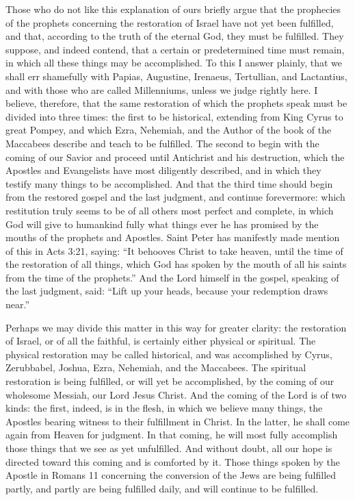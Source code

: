 Those who do not like this explanation of ours briefly argue that the prophecies of the prophets concerning the restoration of Israel have not yet been fulfilled, and that, according to the truth of the eternal God, they must be fulfilled. They suppose, and indeed contend, that a certain or predetermined time must remain, in which all these things may be accomplished. To this I answer plainly, that we shall err shamefully with Papias, Augustine, Irenaeus, Tertullian, and Lactantius, and with those who are called Millenniums, unless we judge rightly here. I believe, therefore, that the same restoration of which the prophets speak must be divided into three times: the first to be historical, extending from King Cyrus to great Pompey, and which Ezra, Nehemiah, and the Author of the book of the Maccabees describe and teach to be fulfilled. The second to begin with the coming of our Savior and proceed until Antichrist and his destruction, which the Apostles and Evangelists have most diligently described, and in which they testify many things to be accomplished. And that the third time should begin from the restored gospel and the last judgment, and continue forevermore: which restitution truly seems to be of all others most perfect and complete, in which God will give to humankind fully what things ever he has promised by the mouths of the prophets and Apostles. Saint Peter has manifestly made mention of this in Acts 3:21, saying: “It behooves Christ to take heaven, until the time of the restoration of all things, which God has spoken by the mouth of all his saints from the time of the prophets.” And the Lord himself in the gospel, speaking of the last judgment, said: “Lift up your heads, because your redemption draws near.”

Perhaps we may divide this matter in this way for greater clarity: the restoration of Israel, or of all the faithful, is certainly either physical or spiritual. The physical restoration may be called historical, and was accomplished by Cyrus, Zerubbabel, Joshua, Ezra, Nehemiah, and the Maccabees. The spiritual restoration is being fulfilled, or will yet be accomplished, by the coming of our wholesome Messiah, our Lord Jesus Christ. And the coming of the Lord is of two kinds: the first, indeed, is in the flesh, in which we believe many things, the Apostles bearing witness to their fulfillment in Christ. In the latter, he shall come again from Heaven for judgment. In that coming, he will most fully accomplish those things that we see as yet unfulfilled. And without doubt, all our hope is directed toward this coming and is comforted by it. Those things spoken by the Apostle in Romans 11 concerning the conversion of the Jews are being fulfilled partly, and partly are being fulfilled daily, and will continue to be fulfilled.

